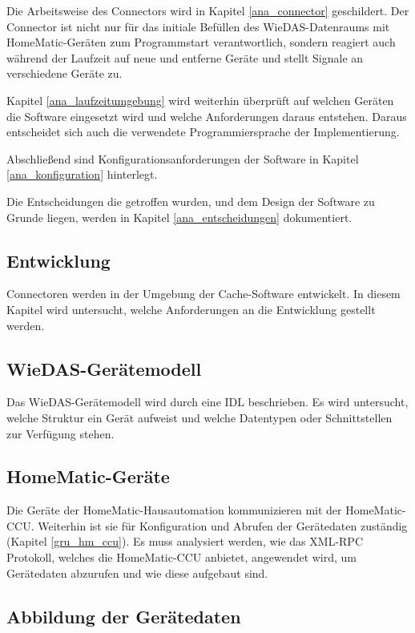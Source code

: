Die Arbeitsweise des Connectors wird in Kapitel \ref{ana_connector} geschildert.
Der Connector ist nicht nur für das initiale Befüllen des WieDAS-Datenraums mit HomeMatic-Geräten
zum Programmstart verantwortlich, sondern reagiert auch während der Laufzeit auf neue und entferne Geräte
und stellt Signale an verschiedene Geräte zu.

Kapitel \ref{ana_laufzeitumgebung} wird weiterhin überprüft auf welchen Geräten die Software eingesetzt wird
und welche Anforderungen daraus entstehen.
Daraus entscheidet sich auch die verwendete Programmiersprache der Implementierung.

Abschließend sind Konfigurationsanforderungen der Software in Kapitel \ref{ana_konfiguration} hinterlegt.

Die Entscheidungen die getroffen wurden, und dem Design der Software zu Grunde liegen, werden in
Kapitel \ref{ana_entscheidungen} dokumentiert.

\subsection{Entwicklung}

Connectoren werden in der Umgebung der Cache-Software entwickelt.
In diesem Kapitel wird untersucht, welche Anforderungen an die Entwicklung gestellt werden.

\subsection{WieDAS-Gerätemodell}

Das WieDAS-Gerätemodell wird durch eine IDL beschrieben.
Es wird untersucht, welche Struktur ein Gerät aufweist und welche Datentypen oder Schnittstellen
zur Verfügung stehen.

\subsection{HomeMatic-Geräte}

Die Geräte der HomeMatic-Hausautomation kommunizieren mit der HomeMatic-CCU.
Weiterhin ist sie für Konfiguration und Abrufen der Gerätedaten zuständig (Kapitel \ref{gru_hm_ccu}).
Es muss analysiert werden, wie das XML-RPC Protokoll, welches die HomeMatic-CCU anbietet,
angewendet wird, um Gerätedaten abzurufen und wie diese aufgebaut sind.

\subsection{Abbildung der Gerätedaten}

